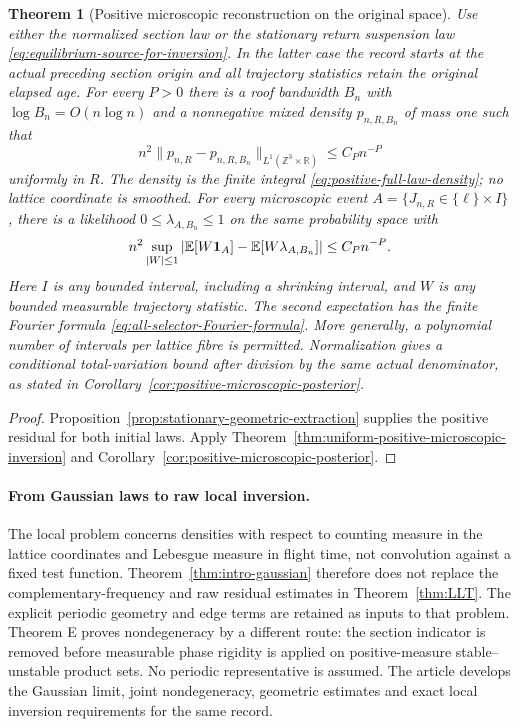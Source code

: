 \documentclass[11pt,reqno]{amsart}
\numberwithin{equation}{section}
\newtheorem{maintheorem}{Theorem}
\theoremstyle{definition}\newtheorem{definition}[theorem]{Definition}
\theoremstyle{remark}\newtheorem{remark}[theorem]{Remark}
\newcommand{\R}{\mathbb R}\newcommand{\Z}{\mathbb Z}\newcommand{\T}{\mathbb T}
\begin{document}
\begin{maintheorem}[Positive microscopic reconstruction on the original space]
\label{thm:intro-positive-microscopic-conditioning}
Use either the normalized section law or the stationary return
suspension law \eqref{eq:equilibrium-source-for-inversion}. In the latter
case the record starts at the actual preceding section origin and all
trajectory statistics retain the original elapsed age.
For every $P>0$ there is a roof bandwidth $B_n$ with
$\log B_n=O(n\log n)$ and a nonnegative mixed density $p_{n,R,B_n}$
of mass one such that
\[
 n^2\|p_{n,R}-p_{n,R,B_n}\|_{L^1(\Z^3\times\R)}\le C_Pn^{-P}
\]
uniformly in $R$. The density is the finite integral
\eqref{eq:positive-full-law-density}; no lattice coordinate is smoothed.
For every microscopic event $A=\{J_{n,R}\in\{\ell\}\times I\}$, there
is a likelihood $0\le\lambda_{A,B_n}\le1$ on the same probability
space with
\[
 n^2\sup_{|W|\le1}
 \left|\mathbb E[W\mathbf1_A]-\mathbb E[W\lambda_{A,B_n}]\right|
        \le C_Pn^{-P}.
\]
Here $I$ is any bounded interval, including a shrinking interval, and
$W$ is any bounded measurable trajectory statistic. The second
expectation has the finite Fourier formula
\eqref{eq:all-selector-Fourier-formula}. More generally, a polynomial
number of intervals per lattice fibre is permitted. Normalization gives
a conditional total-variation bound after division by the same actual
denominator, as stated in Corollary~\ref{cor:positive-microscopic-posterior}.
\end{maintheorem}
\begin{proof}
Proposition~\ref{prop:stationary-geometric-extraction} supplies the
positive residual for both initial laws. Apply
Theorem~\ref{thm:uniform-positive-microscopic-inversion} and
Corollary~\ref{cor:positive-microscopic-posterior}.
\end{proof}

\paragraph{From Gaussian laws to raw local inversion.}
The local problem concerns densities with respect to counting measure
in the lattice coordinates and Lebesgue measure in flight time, not
convolution against a fixed test function. Theorem~\ref{thm:intro-gaussian}
therefore does not replace the complementary-frequency and raw residual
estimates in Theorem~\ref{thm:LLT}. The explicit periodic geometry
and edge terms are retained as inputs to that problem. Theorem E proves
nondegeneracy by a different route: the section indicator is removed
before measurable phase rigidity is applied on positive-measure
stable--unstable product sets. No periodic representative is assumed.
The article develops the Gaussian limit, joint nondegeneracy, geometric
estimates and exact local inversion requirements for the same record.
\end{document}
